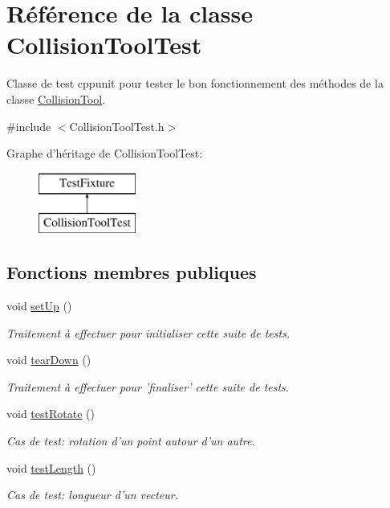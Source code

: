 \hypertarget{class_collision_tool_test}{\section{Référence de la classe Collision\-Tool\-Test}
\label{class_collision_tool_test}
}


Classe de test cppunit pour tester le bon fonctionnement des méthodes de la classe \hyperlink{class_collision_tool}{Collision\-Tool}.  




{\ttfamily \#include $<$Collision\-Tool\-Test.\-h$>$}

Graphe d'héritage de Collision\-Tool\-Test\-:\begin{figure}[H]
\begin{center}
\leavevmode
\includegraphics[height=2.000000cm]{class_collision_tool_test}
\end{center}
\end{figure}
\subsection*{Fonctions membres publiques}
\begin{DoxyCompactItemize}
\item 
void \hyperlink{group__inf2990_ga6924da693899b253751b489928bd5e04}{set\-Up} ()
\begin{DoxyCompactList}\small\item\em Traitement à effectuer pour initialiser cette suite de tests. \end{DoxyCompactList}\item 
void \hyperlink{group__inf2990_gae8e5960d925ec082674afdd45e7ea368}{tear\-Down} ()
\begin{DoxyCompactList}\small\item\em Traitement à effectuer pour 'finaliser' cette suite de tests. \end{DoxyCompactList}\item 
void \hyperlink{group__inf2990_gabd062c4f55b2f09df44c6defd20bea7f}{test\-Rotate} ()
\begin{DoxyCompactList}\small\item\em Cas de test\-: rotation d'un point autour d'un autre. \end{DoxyCompactList}\item 
void \hyperlink{group__inf2990_ga0951a401c6a0fb9bdd17c990827e6d57}{test\-Length} ()
\begin{DoxyCompactList}\small\item\em Cas de test\-: longueur d'un vecteur. \end{DoxyCompactList}\end{DoxyCompactItemize}


